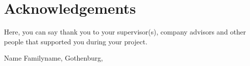 \thispagestyle{plain}			%
\section*{Acknowledgements}
Here, you can say thank you to your supervisor(s), company advisors and other people that supported you during your project.

\vspace{1.5cm}
\hfill
Name Familyname, Gothenburg, \monthname \space \the\year

\newpage				%
\thispagestyle{empty}
\mbox{}
